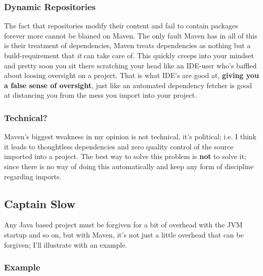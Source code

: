 \subsubsection{ Dynamic Repositories }

The fact that repositories modify their content and fail to contain
packages forever more cannot be blamed on Maven. The only fault Maven
has in all of this is their treatment of dependencies, Maven treats
dependencies as nothing but a build-requirement that \textit{it} can  take care
of.  This quickly creeps into your mindset and pretty soon you sit there
scratching your head like an  IDE-user who's baffled about loosing
oversight on a project. That is what IDE's are good at, \textbf{giving you a
false sense of oversight}, just like an automated dependency fetcher is
good at distancing you from the mess you import into your project.



\subsubsection{ Technical? }

Maven's biggest weakness in my opinion is not technical, it's political;
i.e. I think it leads to thoughtless dependencies and zero quality
control of the source imported into a project. The best way to solve this
problem is \textbf{not} to solve it; since there is no way of doing this
automatically and keep any form of discipline regarding imports.



\subsection{ Captain Slow }

Any Java based project must be forgiven for a bit of overhead with the
JVM startup and so on, but with Maven, it's not just a little overhead
that can be forgiven; I'll illustrate with an example.


\subsubsection{ Example }


